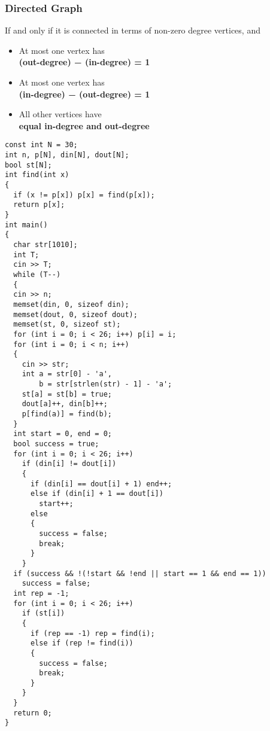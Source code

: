\subsubsection{Directed Graph}
If and only if it is connected in terms of non-zero degree vertices, and
\begin{itemize}
  \item At most one vertex has \\
  \textbf{(out-degree) − (in-degree) = 1}
  \item At most one vertex has \\
  \textbf{(in-degree) − (out-degree) = 1}
  \item All other vertices have \\
  \textbf{equal in-degree and out-degree}
\end{itemize}
\begin{lstlisting}
const int N = 30;
int n, p[N], din[N], dout[N];
bool st[N];
int find(int x)
{
  if (x != p[x]) p[x] = find(p[x]);
  return p[x];
}
int main()
{
  char str[1010];
  int T;
  cin >> T;
  while (T--)
  {
  cin >> n;
  memset(din, 0, sizeof din);
  memset(dout, 0, sizeof dout);
  memset(st, 0, sizeof st);
  for (int i = 0; i < 26; i++) p[i] = i;
  for (int i = 0; i < n; i++)
  {
    cin >> str;
    int a = str[0] - 'a', 
        b = str[strlen(str) - 1] - 'a';
    st[a] = st[b] = true;
    dout[a]++, din[b]++;
    p[find(a)] = find(b);
  }
  int start = 0, end = 0;
  bool success = true;
  for (int i = 0; i < 26; i++)
    if (din[i] != dout[i])
    {
      if (din[i] == dout[i] + 1) end++;
      else if (din[i] + 1 == dout[i])
        start++;
      else
      {
        success = false;
        break;
      }
    }
  if (success && !(!start && !end || start == 1 && end == 1))
    success = false;
  int rep = -1;
  for (int i = 0; i < 26; i++)
    if (st[i])
    {
      if (rep == -1) rep = find(i);
      else if (rep != find(i))
      {
        success = false;
        break;
      }
    }
  }
  return 0;
}
\end{lstlisting}
